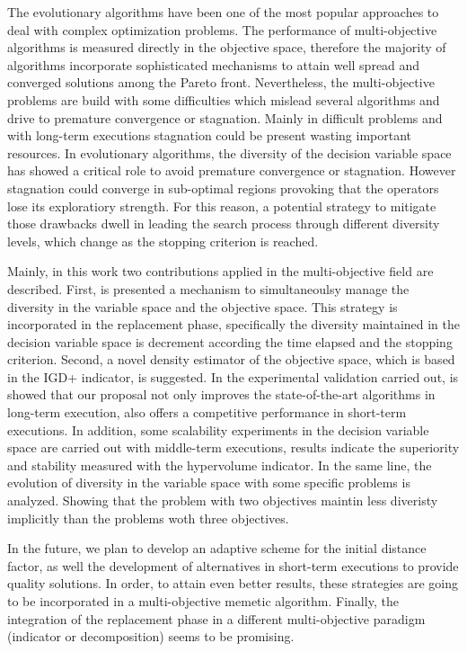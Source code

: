 The evolutionary algorithms have been one of the most popular approaches to deal with complex optimization problems.
%
The performance of multi-objective algorithms is measured directly in the objective space, therefore the majority of algorithms incorporate sophisticated mechanisms to attain well spread and converged solutions among the Pareto front.
%
Nevertheless, the multi-objective problems are build with some difficulties which mislead several algorithms and drive to premature convergence or stagnation.
%
Mainly in difficult problems and with long-term executions stagnation could be present wasting important resources.
%
In evolutionary algorithms, the diversity of the decision variable space has showed a critical role to avoid premature convergence or stagnation.
%
However stagnation could converge in sub-optimal regions provoking that the operators lose its exploratiory strength.
%
For this reason, a potential strategy to mitigate those drawbacks dwell in leading the search process through different diversity levels, which change as the stopping criterion is reached.

Mainly, in this work two contributions applied in the multi-objective field are described.
%
First, is presented a mechanism to simultaneoulsy manage the diversity in the variable space and the objective space.
%
This strategy is incorporated in the replacement phase, specifically the diversity maintained in the decision variable space is decrement according the time elapsed and the stopping criterion.
%
Second, a novel density estimator of the objective space, which is based in the IGD+ indicator, is suggested.
%
In the experimental validation carried out, is showed that our proposal not only improves the state-of-the-art algorithms in long-term execution, also offers a competitive performance in short-term executions.
%
%
In addition, some scalability experiments in the decision variable space are carried out with middle-term executions, results indicate the superiority and stability measured with the hypervolume indicator.
%
In the same line, the evolution of diversity in the variable space with some specific problems is analyzed.
%
Showing that the problem with two objectives maintin less diveristy implicitly than the problems woth three objectives.
%


In the future, we plan to develop an adaptive scheme for the initial distance factor, as well the development of alternatives in short-term executions to provide quality solutions.
%
In order, to attain even better results, these strategies are going to be incorporated in a multi-objective memetic algorithm.
%
Finally, the integration of the replacement phase in a different multi-objective paradigm (indicator or decomposition) seems to be promising.


